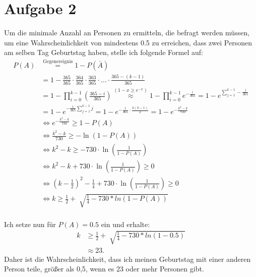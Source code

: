 \documentclass[a4paper]{scrartcl}
\begin{document}
\section*{Aufgabe 2}
Um die minimale Anzahl an Personen zu ermitteln, die befragt werden müssen, um eine Wahrscheinlichkeit von mindestens 0.5 zu erreichen, dass zwei Personen am selben Tag Geburtstag haben, stelle ich folgende Formel auf: \vspace{6pt}
\[
\begin{aligned}
    P(A) &\overset{\text{Gegenereignis}}{=} 1 - P(\bar{A}) \\
    &= 1 - \frac{365}{365} \cdot \frac{364}{365} \cdot \frac{363}{365} \cdot \ldots \cdot \frac{365-(k-1)}{365} \\
    &= 1 - \prod^{k-1}_{i=0} (\frac{365-i}{365}) \overset{(1-x \geq e^{-x})}{\approx} 1 - \prod^{k-1}_{i=0} e^{-\frac{i}{365}} = 1 - e^{\sum ^{k-1}_{j=1} - \frac{j}{365}} \\
    &= 1 - e^{-\frac{1}{365} \sum ^{k-1}_{j=1} j} = 1 - e^{-\frac{1}{365} \cdot \frac{k(k-1)}{2}} = 1 - e^{-\frac{k^2 - k}{730}} \\
    &\Leftrightarrow e^{-\frac{k^2 - k}{730}} \geq 1 - P(A) \\
    &\Leftrightarrow \frac{k^2 - k}{730} \geq - \ln(1 - P(A)) \\
    &\Leftrightarrow k^2 - k \geq - 730 \cdot \ln(\frac{1}{1 - P(A)}) \\
    &\Leftrightarrow k^2 - k + 730 \cdot \ln(\frac{1}{1 - P(A)}) \geq 0 \\
    &\Leftrightarrow (k-\frac{1}{2})^2 - \frac{1}{4} + 730 \cdot \ln(\frac{1}{1 - P(A)}) \geq 0 \\
    &\Leftrightarrow k \geq \frac{1}{2} + \sqrt[]{\frac{1}{4}-730*ln(1-P(A))} \\
\end{aligned}
\]

Ich setze nun für $P(A) = 0.5$ ein und erhalte: \vspace{6pt}
\[
\begin{aligned}
    k &\geq \frac{1}{2} + \sqrt[]{\frac{1}{4}-730*ln(1-0.5)} \\
    &\approx 23.
\end{aligned}
\]
Daher ist die Wahrscheinlichkeit, dass ich meinen Geburtstag mit einer anderen Person teile, größer als 0,5, wenn es 23 oder mehr Personen gibt.
\end{document}
